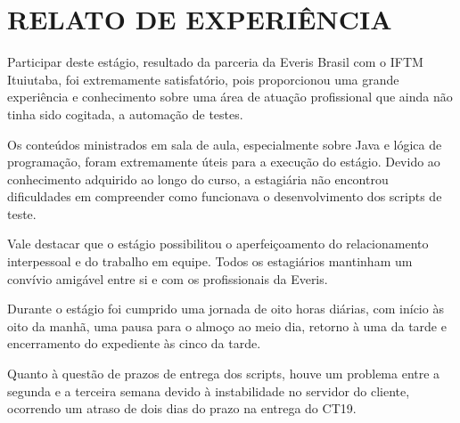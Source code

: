 \section{RELATO DE EXPERIÊNCIA}


Participar deste estágio, resultado da parceria da Everis Brasil com o IFTM Ituiutaba, foi extremamente satisfatório, pois proporcionou uma grande experiência e conhecimento sobre uma área de atuação profissional que ainda não tinha sido cogitada, a automação de testes.

Os conteúdos ministrados em sala de aula, especialmente sobre Java e lógica de programação, foram extremamente úteis para a execução do estágio. Devido ao conhecimento adquirido ao longo do curso, a estagiária não encontrou dificuldades em compreender como funcionava o desenvolvimento dos scripts de teste.

Vale destacar que o estágio possibilitou o aperfeiçoamento do relacionamento interpessoal e do trabalho em equipe. Todos os estagiários mantinham um convívio amigável entre si e com os profissionais da Everis. 

Durante o estágio foi cumprido uma jornada de oito horas diárias, com início às oito da manhã, uma pausa para o almoço ao meio dia, retorno à uma da tarde e encerramento do expediente às cinco da tarde.

Quanto à questão de prazos de entrega dos scripts, houve um problema entre a segunda e a terceira semana devido à instabilidade no servidor do cliente, ocorrendo um atraso de dois dias do prazo na entrega do CT19.
